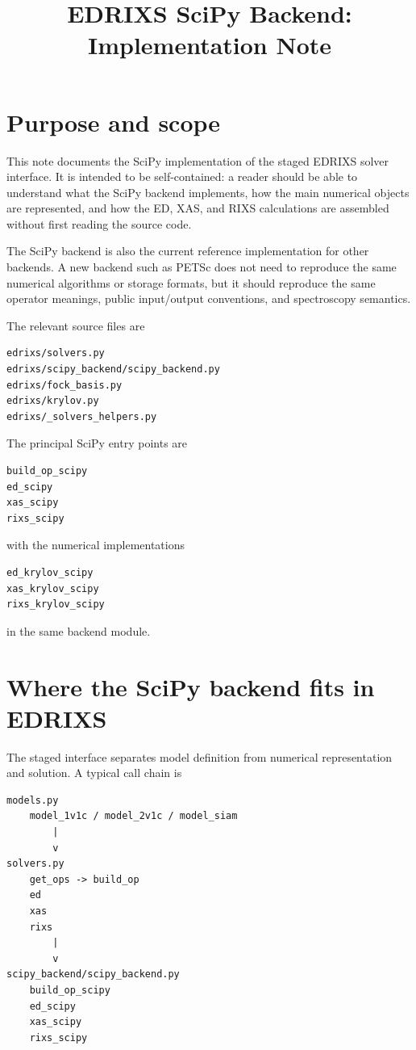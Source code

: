 \documentclass[11pt]{article}
\title{EDRIXS SciPy Backend: Implementation Note}
\author{}
\begin{document}
\maketitle
\tableofcontents
\newpage

\section{Purpose and scope}

This note documents the SciPy implementation of the staged EDRIXS solver interface.  It is intended to be self-contained: a reader should be able to understand what the SciPy backend implements, how the main numerical objects are represented, and how the ED, XAS, and RIXS calculations are assembled without first reading the source code.

The SciPy backend is also the current reference implementation for other backends.  A new backend such as PETSc does not need to reproduce the same numerical algorithms or storage formats, but it should reproduce the same operator meanings, public input/output conventions, and spectroscopy semantics.

The relevant source files are

\begin{lstlisting}
edrixs/solvers.py
edrixs/scipy_backend/scipy_backend.py
edrixs/fock_basis.py
edrixs/krylov.py
edrixs/_solvers_helpers.py
\end{lstlisting}

The principal SciPy entry points are

\begin{lstlisting}
build_op_scipy
ed_scipy
xas_scipy
rixs_scipy
\end{lstlisting}

with the numerical implementations

\begin{lstlisting}
ed_krylov_scipy
xas_krylov_scipy
rixs_krylov_scipy
\end{lstlisting}

in the same backend module.

\section{Where the SciPy backend fits in EDRIXS}

The staged interface separates model definition from numerical representation and solution.  A typical call chain is

\begin{lstlisting}
models.py
    model_1v1c / model_2v1c / model_siam
        |
        v
solvers.py
    get_ops -> build_op
    ed
    xas
    rixs
        |
        v
scipy_backend/scipy_backend.py
    build_op_scipy
    ed_scipy
    xas_scipy
    rixs_scipy
\end{lstlisting}
\end{document}
